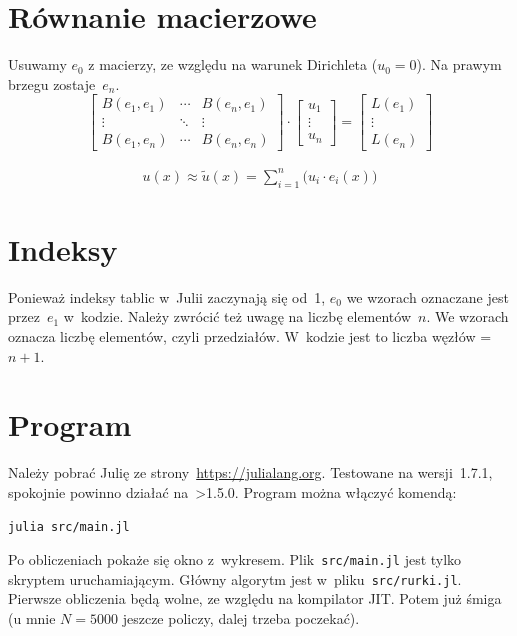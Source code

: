 \documentclass[12pt,a4paper]{mwart}
\begin{document}
\section{Równanie macierzowe}
Usuwamy $e_0$ z macierzy, ze względu na warunek Dirichleta
($u_0 = 0$).
Na prawym brzegu zostaje~$e_n$.
\begin{equation*}
    \left[
    \begin{matrix}
        B(e_1, e_1) & \cdots & B(e_n, e_1) \\
        \vdots      & \ddots & \vdots \\
        B(e_1, e_n) & \cdots & B(e_n, e_n)
    \end{matrix}
    \right]
    \cdot
    \left[
    \begin{matrix}
        u_1 \\
        \vdots \\
        u_n
    \end{matrix}
    \right]
    =
    \left[
    \begin{matrix}
        L(e_1) \\
        \vdots \\
        L(e_n)
    \end{matrix}
    \right]
\end{equation*}

\begin{align*}
    u(x) \approx \tilde{u}(x) = \sum_{i=1}^n\big(u_i \cdot e_i(x)\big)
\end{align*}

\section{Indeksy}
Ponieważ indeksy tablic w~Julii zaczynają się od~1,
$e_0$ we wzorach oznaczane jest przez~$e_1$ w~kodzie.
Należy zwrócić też uwagę na liczbę elementów~$n$.
We wzorach oznacza liczbę elementów, czyli przedziałów.
W~kodzie jest to liczba węzłów = $n+1$.

\section{Program}
Należy pobrać Julię ze strony~\url{https://julialang.org}.
Testowane na wersji~1.7.1, spokojnie powinno działać na~>1.5.0.
Program można włączyć komendą:
\begin{verbatim}
julia src/main.jl
\end{verbatim}
Po obliczeniach pokaże się okno z~wykresem.
Plik~\verb|src/main.jl| jest tylko skryptem
uruchamiającym.
Główny algorytm jest w~pliku~\verb|src/rurki.jl|.
Pierwsze obliczenia będą wolne, ze względu
na kompilator JIT. Potem już śmiga
(u mnie $N=5000$ jeszcze policzy, dalej trzeba poczekać).
\end{document}
